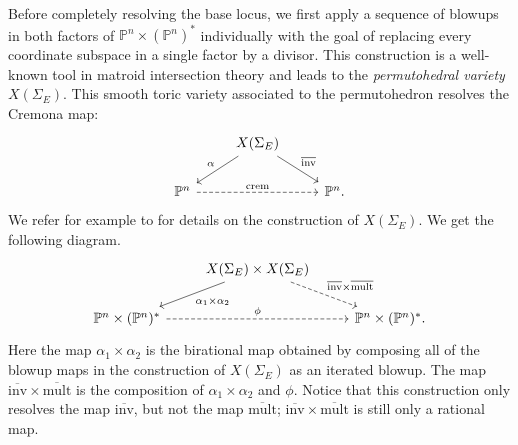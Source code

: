 \documentclass[12pt,a4paper,english]{scrartcl}
\newcommand{\PP}{\mathbb{P}}
\begin{document}
Before completely resolving the base locus, we first apply a sequence of blowups in both factors of $\PP^n \times (\PP^n)^*$ individually with the goal of replacing every coordinate subspace in a single factor by a divisor. This construction is a well-known tool in matroid intersection theory and leads to the \emph{permutohedral variety} $X(\Sigma_E)$. This smooth toric variety associated to the permutohedron resolves the Cremona map:
\[
\begin{tikzcd}
& X(\Sigma_E)\arrow[ld,"\alpha"'] \arrow[rd,"\overline{\text{inv}}"] &                    \\ \PP^n \arrow[rr, "\text{crem}", dashed] &                              & \PP^n.
\end{tikzcd}
\]
We refer for example to \cite{BEST2023} for details on the construction of $X(\Sigma_E)$. We get the following diagram. 
\begin{equation}
\label{eq:naiveblowupdiagram}
\begin{tikzcd}
& X(\Sigma_E) \times X(\Sigma_E) \arrow[ld,"\alpha_1\times \alpha_2"] \arrow[rd, dashed,"\overline{\text{inv}}\times \overline{\text{mult}}"] &                    \\ \PP^n \times (\PP^n)^* \arrow[rr, "\phi", dashed] &                              & \PP^n \times (\PP^n)^*.
\end{tikzcd}
\end{equation}
Here the map $\alpha_1\times \alpha_2$ is the birational map obtained by composing all of the blowup maps in the construction of $X(\Sigma_E)$ as an iterated blowup. The map $\overline{\text{inv}}\times \overline{\text{mult}}$ is the composition of $\alpha_1\times \alpha_2$ and $\phi$. 
Notice that this construction only resolves the map $\overline{\text{inv}}$, but not the map $\overline{\text{mult}}$; $\overline{\text{inv}}\times \overline{\text{mult}}$ is still only a rational map.
\end{document}
